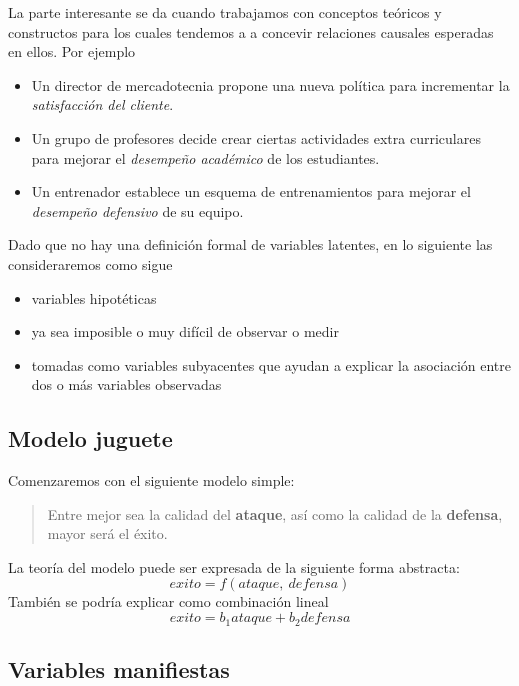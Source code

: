 \documentclass{paper}
\begin{document}
La parte interesante se da cuando trabajamos con conceptos te\'oricos y constructos para los cuales tendemos a a concevir relaciones causales esperadas en ellos. Por ejemplo
\begin{itemize}
  \item Un director de mercadotecnia propone una nueva pol\'itica para incrementar la {\em satisfacci\'on del cliente}.
  \item Un grupo de profesores decide crear ciertas actividades extra curriculares para mejorar el {\em desempe\~no acad\'emico} de los estudiantes.
  \item Un entrenador establece un esquema de entrenamientos para mejorar el {\em desempe\~no defensivo} de su equipo.
\end{itemize}

Dado que no hay una definici\'on formal de variables latentes, en lo siguiente las consideraremos como sigue
\begin{itemize}
  \item variables hipot\'eticas
  \item ya sea imposible o muy dif\'icil de observar o medir
  \item tomadas como variables subyacentes que ayudan a explicar la asociaci\'on entre dos o m\'as variables observadas
\end{itemize}

\subsection{Modelo juguete}

Comenzaremos con el siguiente modelo simple:

\begin{quote}
Entre mejor sea la calidad del {\bf ataque}, as\'i como la calidad de la {\bf defensa}, mayor ser\'a el {\'exito.}
\end{quote}
La teor\'ia del modelo puede ser expresada de la siguiente forma abstracta:
\begin{displaymath}
exito = f(ataque, ~defensa)
\end{displaymath}
Tambi\'en se podr\'ia explicar como combinaci\'on lineal
\begin{displaymath}
exito = b_1 ataque + b_2 defensa
\end{displaymath}

\subsection{Variables manifiestas}
\end{document}
